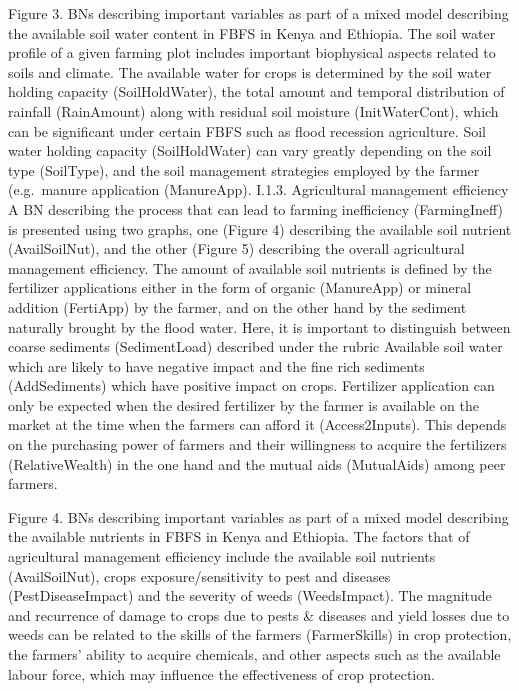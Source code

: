 \documentclass[12pt,oneside]{article}
\begin{document}
Figure 3. BNs describing important variables as part of a mixed model describing the available soil water content in FBFS in Kenya and Ethiopia.
The soil water profile of a given farming plot includes important biophysical aspects related to soils and climate. The available water for crops is determined by the soil water holding capacity (SoilHoldWater), the total amount and temporal distribution of rainfall (RainAmount) along with residual soil moisture (InitWaterCont), which can be significant under certain FBFS such as flood recession agriculture. Soil water holding capacity (SoilHoldWater) can vary greatly depending on the soil type (SoilType), and the soil management strategies employed by the farmer (e.g.~manure application (ManureApp).
I.1.3. Agricultural management efficiency
A BN describing the process that can lead to farming inefficiency (FarmingIneff) is presented using two graphs, one (Figure 4) describing the available soil nutrient (AvailSoilNut), and the other (Figure 5) describing the overall agricultural management efficiency. The amount of available soil nutrients is defined by the fertilizer applications either in the form of organic (ManureApp) or mineral addition (FertiApp) by the farmer, and on the other hand by the sediment naturally brought by the flood water. Here, it is important to distinguish between coarse sediments (SedimentLoad) described under the rubric Available soil water which are likely to have negative impact and the fine rich sediments (AddSediments) which have positive impact on crops. Fertilizer application can only be expected when the desired fertilizer by the farmer is available on the market at the time when the farmers can afford it (Access2Inputs). This depends on the purchasing power of farmers and their willingness to acquire the fertilizers (RelativeWealth) in the one hand and the mutual aids (MutualAids) among peer farmers.

Figure 4. BNs describing important variables as part of a mixed model describing the available nutrients in FBFS in Kenya and Ethiopia.
The factors that of agricultural management efficiency include the available soil nutrients (AvailSoilNut), crops exposure/sensitivity to pest and diseases (PestDiseaseImpact) and the severity of weeds (WeedsImpact). The magnitude and recurrence of damage to crops due to pests \& diseases and yield losses due to weeds can be related to the skills of the farmers (FarmerSkills) in crop protection, the farmers' ability to acquire chemicals, and other aspects such as the available labour force, which may influence the effectiveness of crop protection.
\end{document}
